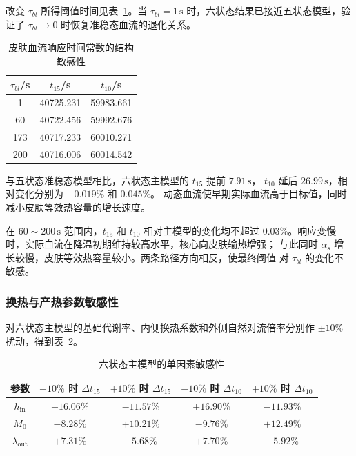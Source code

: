 \documentclass[withoutpreface,bwprint]{cumcmthesis}
\begin{document}
改变 $\tau_{bl}$ 所得阈值时间见表~\ref{tab:q1-tau-check}。当
$\tau_{bl}=1\,\mathrm s$ 时，六状态结果已接近五状态模型，验证了
$\tau_{bl}\to0$ 时恢复准稳态血流的退化关系。

\begin{table}[H]
    \centering
    \caption{皮肤血流响应时间常数的结构敏感性}
    \label{tab:q1-tau-check}
    \begin{tabular}{ccc}
        \toprule[1.5pt]
        $\tau_{bl}$/s & $t_{15}$/s & $t_{10}$/s\\
        \midrule[1pt]
        1   & 40725.231 & 59983.661\\
        60  & 40722.456 & 59992.676\\
        173 & 40717.233 & 60010.271\\
        200 & 40716.006 & 60014.542\\
        \bottomrule[1.5pt]
    \end{tabular}
\end{table}

与五状态准稳态模型相比，六状态主模型的 $t_{15}$ 提前 $7.91\,\mathrm s$，
$t_{10}$ 延后 $26.99\,\mathrm s$，相对变化分别为 $-0.019\%$ 和 $0.045\%$。
动态血流使早期实际血流高于目标值，同时减小皮肤等效热容量的增长速度。

在 $60\sim200\,\mathrm s$ 范围内，$t_{15}$ 和 $t_{10}$ 相对主模型的变化均不超过
$0.03\%$。响应变慢时，实际血流在降温初期维持较高水平，核心向皮肤输热增强；
与此同时 $\alpha_s$ 增长较慢，皮肤等效热容量较小。两条路径方向相反，使最终阈值
对 $\tau_{bl}$ 的变化不敏感。

\subsubsection{换热与产热参数敏感性}

对六状态主模型的基础代谢率、内侧换热系数和外侧自然对流倍率分别作
$\pm10\%$ 扰动，得到表~\ref{tab:q1-six-sensitivity}。

\begin{table}[H]
    \centering
    \small
    \caption{六状态主模型的单因素敏感性}
    \label{tab:q1-six-sensitivity}
    \begin{tabular}{ccccc}
        \toprule[1.5pt]
        参数 & $-10\%$ 时 $\Delta t_{15}$ & $+10\%$ 时 $\Delta t_{15}$
        & $-10\%$ 时 $\Delta t_{10}$ & $+10\%$ 时 $\Delta t_{10}$\\
        \midrule[1pt]
        $h_{\mathrm{in}}$ & $+16.06\%$ & $-11.57\%$
        & $+16.90\%$ & $-11.93\%$\\
        $M_0$ & $-8.28\%$ & $+10.21\%$
        & $-9.76\%$ & $+12.49\%$\\
        $\lambda_{\mathrm{out}}$ & $+7.31\%$ & $-5.68\%$
        & $+7.70\%$ & $-5.92\%$\\
        \bottomrule[1.5pt]
    \end{tabular}
\end{table}
\end{document}
